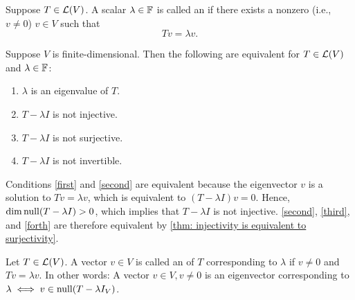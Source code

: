 \begin{mydef} [eigenvalue]
  Suppose $T\in \mathcal{L} (V)$. A scalar $\lambda \in \mathbb{F}$ is called an  if there exists a nonzero (i.e., $v \neq 0$) $v \in V$ such that
  \begin{equation}
    Tv = \lambda v.
  \end{equation}
\end{mydef}

\setcounter{thm}{6}
\begin{thm} 
  \label{thm: equivalent conditions to be an eigenvalue}
  Suppose $V$ is finite-dimensional. Then the following are equivalent for $T \in \mathcal{L}(V)$ and $\lambda \in \mathbb{F}$:
  \begin{enumerate}[label=\textbf{(\alph*)}]
    \item $\lambda$ is an eigenvalue of $T$. \label{first}
    \item $T-\lambda I$ is not injective. \label{second}
    \item $T-\lambda I$ is not surjective. \label{third}
    \item $T-\lambda I$ is not invertible. \label{forth}
  \end{enumerate}
\end{thm}
\begin{prf}
  Conditions \ref{first} and \ref{second} are equivalent because the eigenvector $v$ is a solution to $Tv=\lambda v$, which is equivalent to $(T-\lambda I)v=0$. Hence, $\dim \operatorname{null} (T-\lambda I) > 0$, which implies that $T-\lambda I$ is not injective.
  \ref{second}, \ref{third}, and \ref{forth} are therefore equivalent by
  \ref{thm: injectivity is equivalent to surjectivity}.
\end{prf}

\setcounter{thm}{7}
\begin{mydef} [eigenvector]
  Let $T\in \mathcal{L}(V)$. A vector $v \in V$ is called an  of $T$ corresponding to $\lambda$ if $v\neq 0$ and $Tv = \lambda v$.
  In other words:
  A vector $v\in V, v \neq 0$ is an eigenvector corresponding to $\lambda \iff v \in \operatorname{null}(T-\lambda I_V)$.
\end{mydef}

